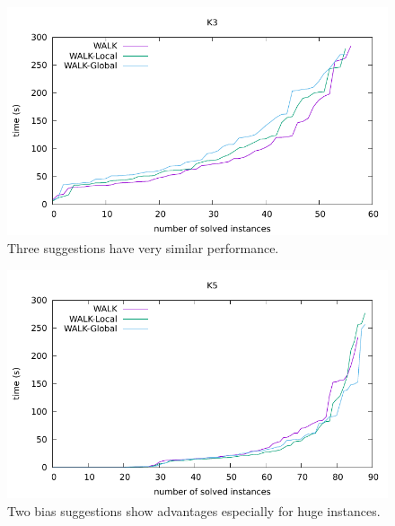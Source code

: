 \documentclass[12pt,a4paper,twoside]{scrartcl}
\numberwithin{equation}{section}
\begin{document}
\begin{figure}[H]
\begin{center}
  \includegraphics[scale = 1]{DATA/K3/e3w.pdf}
  \end{center}
  \caption{Three suggestions have very similar performance.}
  \label{Experiment 3 k3-w cactus plot}
  \end{figure}
  \begin{figure}[H]
\begin{center}
  \includegraphics[scale = 1]{DATA/K5/e3w.pdf}
  \end{center}
  \caption{Two bias suggestions show advantages especially for huge instances.}
  \label{Experiment 3 k5-w cactus plot}
  \end{figure}
\end{document}
